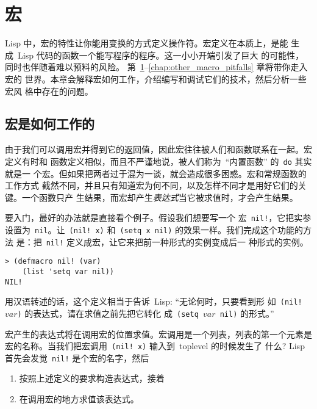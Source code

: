 
\chapter{宏}
\label{chap:macros}

Lisp 中，宏的特性让你能用变换的方式定义操作符。宏定义在本质上，是能
生成~Lisp 代码的函数\pozhehao{}一个能写程序的程序。这一小小开端引发了巨大 
的可能性，同时也伴随着难以预料的风险。
第~\ref{chap:macros}--\ref{chap:other_macro_pitfalls} 章将带你走入宏的
世界。本章会解释宏如何工作，介绍编写和调试它们的技术，然后分析一些宏风
格中存在的问题。

\section{宏是如何工作的}
\label{sec:how_macros_work}

由于我们可以调用宏并得到它的返回值，因此宏往往被人们和函数联系在一起。宏定义有时和
函数定义相似，而且不严谨地说，被人们称为~``内置函数'' 的~\texttt{do} 其实就是一
个宏。但如果把两者过于混为一谈，就会造成很多困惑。宏和常规函数的工作方式
截然不同，并且只有知道宏为何不同，以及怎样不同才是用好它们的关键。一个函数只产
生结果，而宏却产生\emph{表达式}\pozhehao{}当它被求值时，才会产生结果。

要入门，最好的办法就是直接看个例子。假设我们想要写一个
宏~\texttt{nil!}，它把实参设置为~\verb|nil|。让~\verb|(nil! x)|
和~\texttt{(setq x nil)} 的效果一样。我们完成这个功能的方法
是：把~\texttt{nil!} 定义成宏，让它来把前一种形式的实例变成后一
种形式的实例。
\begin{lstlisting}
> (defmacro nil! (var)
    (list 'setq var nil))
NIL!
\end{lstlisting}
用汉语转述的话，这个定义相当于告诉~Lisp: ``无论何时，只要看到形
如~\texttt{(nil! $var$)} 的表达式，请在求值之前先把它转化
成~\texttt{(setq $var$ nil)} 的形式。''

宏产生的表达式将在调用宏的位置求值。宏调用是一个列表，列表的第一个元素是
宏的名称。当我们把宏调用~\texttt{(nil! x)} 输入到~toplevel 的时候发生了
什么? Lisp 首先会发觉~\texttt{nil!} 是个宏的名字，然后
\begin{enumerate}
 \item 按照上述定义的要求构造表达式，接着
 \item 在调用宏的地方求值该表达式。
\end{enumerate}

